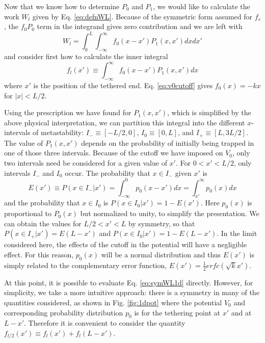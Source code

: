 \documentclass[11pt]{ucthesis}
\begin{document}
Now that we know how to determine $P_0$ and $P_1$, we would like to calculate the
work $W_l$ given by Eq. \ref{eq:defnWL}. Because of the symmetric form assumed
for $f_s$, the $f_0 P_0$ term in the integrand gives zero contribution and we
are left with
\begin{equation}
\label{eq:symWL1d}
W_l = \int_0^L \int_{-\infty}^\infty  f_0(x-x') P_1(x,x')dx dx'
\end{equation}
and consider first how to calculate the inner integral
\begin{equation}
\label{eq:F1d}
f_l(x') \equiv \int_{-\infty}^\infty f_0(x-x') P_1(x,x')dx 
\end{equation}
where $x'$ is the position of the tethered end.  Eq. \ref{eq:v0cutoff} gives $f_0(x) = -kx$ for $|x|<L/2$.

Using the prescription we have found for $P_1(x,x')$, which is simplified by the above physical interpretation, we can partition this integral
into the different $x$-intervals of metastability: $I_- \equiv[-L/2,0]$, $I_0 \equiv [0,L]$, and $I_+ \equiv [L,3L/2]$.
The value of $P_1(x,x')$ depends on the probability of initially being trapped in
one of those three intervals. Because of the cutoff we have imposed on $V_0$,
only two intervals need be considered for a given value of $x'$. For $0 < x' < L/2$, only intervals $I_-$ and
$I_0$ occur.  The probability that $x \in I_-$ given $x'$ is
\begin{equation}
E(x') \equiv P(x \in I_-| x') = \int_{-\infty}^0 p_0(x-x') dx  = \int_{x'}^\infty p_0(x) dx
\end{equation}
and the probability that $x \in I_0$ is $P(x \in I_0|x') = 1-E(x')$.
Here $p_0(x)$ is proportional to $P_0(x)$ but normalized to unity, to simplify
the presentation.
We can obtain the values for $L/2 < x' < L$ by symmetry, so that $P(x \in I_+| x') = E(L-x')$ and
$P(x \in I_0|x') = 1-E(L-x')$.  In the limit considered here, the effects of the cutoff in the potential will have a negligible effect. For this reason, $p_0(x)$ will be a normal distribution and thus $E(x')$ is simply related to the complementary
error function, $E(x') = \frac{1}{2}erfc(\sqrt{k}x')$. 

At this point, it is possible to evaluate Eq. \ref{eq:symWL1d} directly. However, for simplicity, we take a more intuitive approach: there is a symmetry in many of the quantities considered, as shown in Fig. \ref{fig:1dpot} where the
potential $V_0$  and corresponding probability distribution $p_0$ is for the tethering point at
$x'$ and at $L-x'$. Therefore it is convenient to consider the quantity $f_{l/2}(x')\equiv f_l(x') + f_l(L-x')$. 
\end{document}
